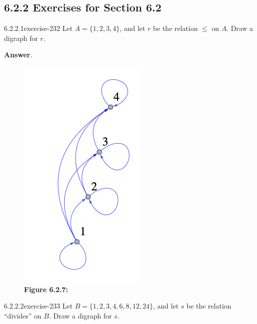 \documentclass[twoside,10pt,]{book}
\numberwithin{equation}{section}
\begin{document}
\subsection*{6.2.2 Exercises for Section 6.2}
\begin{divisionsolution}{6.2.2.1}{}{exercise-232}%
\hypertarget{p-1992}{}%
Let \(A = \{1, 2, 3, 4\}\), and let \(r\) be the relation \(\leq\) on \(A\). Draw a digraph for \(r\).%
\par\smallskip%
\noindent\textbf{Answer}.\quad%
\leavevmode%
\begin{figure}
\centering
\includegraphics[width=0.5\linewidth]{images/fig-sol-6-2-1.png}
\caption*{\textbf{Figure 6.2.7:} }
\end{figure}
\end{divisionsolution}%
\begin{divisionsolution}{6.2.2.2}{}{exercise-233}%
\hypertarget{p-1993}{}%
Let \(B = \{1,2, 3, 4, 6, 8, 12, 24\}\), and let \(s\) be the relation ``divides'' on \(B\). Draw a digraph for \(s\).%
\end{divisionsolution}%
\end{document}
